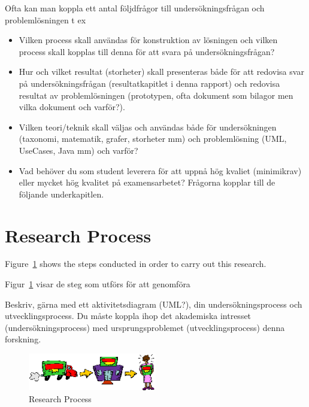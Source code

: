 \documentclass[english]{kththesis}
\newenvironment{swedishnotes}%
  {\begin{center}
      \selectlanguage{swedish}
      \color{blue}}%
    {\end{center}
    \selectlanguage{USenglish}}
\begin{document}
\begin{swedishnotes}
Ofta kan man koppla ett antal följdfrågor till undersökningsfrågan och problemlösningen t ex
\begin{itemize}
\color{blue}
\item Vilken process skall användas för konstruktion av lösningen och vilken process skall kopplas till denna för att svara på undersökningsfrågan?
\item Hur och vilket resultat (storheter) skall presenteras både för att redovisa svar på undersökningsfrågan (resultatkapitlet i denna rapport) och redovisa resultat av problemlösningen (prototypen, ofta dokument som bilagor men vilka dokument och varför?).
\item Vilken teori/teknik skall väljas och användas både för undersökningen (taxonomi, matematik, grafer, storheter mm)  och  problemlösning (UML, UseCases, Java mm) och varför?
\item Vad behöver du som student leverera för att uppnå hög kvaliet (minimikrav) eller mycket hög kvalitet på examensarbetet?
Frågorna kopplar till de följande underkapitlen. 
\end{itemize}
\end{swedishnotes}

\section{Research Process}
\label{sec:researchProcess}
Figure~\ref{fig:researchprocess} shows the steps conducted in order to carry out this research. 
\begin{swedishnotes}
  Figur~\ref{fig:researchprocess} visar de steg som utförs för att genomföra
  
  Beskriv, gärna med ett aktivitetsdiagram (UML?), din undersökningsprocess och utvecklingsprocess.  Du måste koppla ihop det akademiska intresset (undersökningsprocess) med ursprungsproblemet (utvecklingsprocess)
denna forskning.
\end{swedishnotes}
 
\begin{figure}[!h]
  \begin{center}
    \includegraphics[width=0.5\textwidth]{researchprocess.png}
  \end{center}
  \caption{Research Process}
  \label{fig:researchprocess}
\end{figure}
\end{document}
